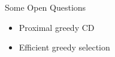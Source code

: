 \documentclass{beamer}
\begin{document}
\begin{frame}
  {
    \begin{center}
      \Huge Some Open Questions
    \end{center}
  }

  \begin{itemize}
  \item Proximal greedy CD
  \item Efficient greedy selection
  \end{itemize}
\end{frame}
\end{document}
